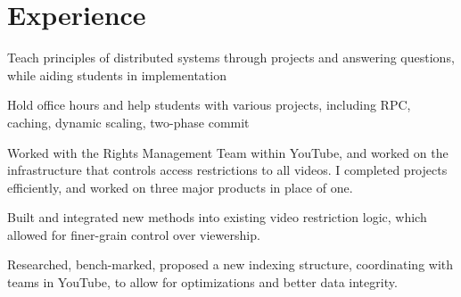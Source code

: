 \documentclass[letterpaper]{deedy-resume}
\begin{document}
  \hfill
  \begin{minipage}[t]{0.66\textwidth}
    \section{Experience}
        \vspace{2pt}

        \vspace{10pt}

        \begin{tightitemize}
          \item Teach principles of distributed systems through projects and
            answering questions, while aiding students in implementation
          \item Hold office hours and help students with various projects,
            including RPC, caching, dynamic scaling, two-phase commit
        \end{tightitemize}


        \begin{tightitemize}
          \item Worked with the Rights Management Team within YouTube, and
            worked on the infrastructure that controls access restrictions to
            all videos. I completed projects efficiently, and worked on three
            major products in place of one.
          \item Built and integrated new methods into existing video restriction
            logic, which allowed for finer-grain control over viewership.
          \item Researched, bench-marked, proposed a new indexing structure,
            coordinating with teams in YouTube, to allow for optimizations and
            better data integrity.
        \end{tightitemize}



\end{minipage}
\end{document}
